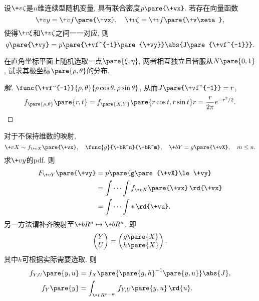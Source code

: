 \documentclass{ctexart}
\begin{document}
\begin{theorem}
    设$\+v\zeta$是$n$维连续型随机变量, 具有联合密度$p\pare{\+vx}$. 若存在向量函数
    \[ \+vy = \+vf\pare{\+vx},\quad \+v\zeta = \+vf\pare{\+v\zeta}, \]
    使得$\+v\xi$和$\+v\zeta$之间一一对应, 则
    \[ q\pare{\+vy} = p\pare{\+vf^{-1}\pare{\+vy}}\abs{J\pare{\+vf^{-1}}}. \]
\end{theorem}
\begin{sample}
    \begin{ex}
        在直角坐标平面上随机选取一点$\pare{\xi,\eta}$, 两者相互独立且皆服从$N\pare{0,1}$, 试求其极坐标$\pare{\rho,\theta}$的分布.
    \end{ex}
    \begin{proof}[解]
        $\func{\+vf^{-1}}{\rho,\theta}{\rho\cos\theta, \rho\sin\theta}$, 从而$J\pare{\+vf^{-1}} = r$,
        \[ f_{\pare{\rho,\theta}}\pare{r,t} = f_{\pare{X,Y}}\pare{r\cos t, r\sin t}r = \frac{r}{2\pi}e^{-r^2/2}. \qedhere \]
    \end{proof}
\end{sample}
对于不保持维数的映射,
\[ \+vX\sim f_{\+vX}\pare{\+vx},\quad \func{g}{\+bR^n}{\+bR^m},\quad \+bY = g\pare{\+vX},\quad m\le n. \]
求$\+vy$的pdf. 则
\begin{align*}
    F_{\+vY}\pare{\+vy} &= p\pare{g\pare{\+vX}\le \+vy} \\
    &= \int\cdots\int f_{\+vX}\pare{\+vx}\,\rd{\+vx} \\
    &= \int\cdots\int * \,\rd{\+vu}.
\end{align*}
另一方法谓补齐映射至$\+bR^n \mapsto \+bR^n$, 即
\[ \begin{pmatrix}
    Y \\
    U
\end{pmatrix} = \begin{pmatrix}
    g\pare{X} \\
    h\pare{X}
\end{pmatrix}. \]
其中$h$可根据实际需要选取. 则
\begin{align*}
    f_{Y,U}\pare{y,u} &= f_X\pare{\pare{g,h}^{-1}\pare{y,u}}\abs{J}, \\
    f_Y\pare{y} &= \int_{\+vR^{n-m}} f_{Y,U}\pare{y,u}\,\rd{u}.
\end{align*}
\end{document}
